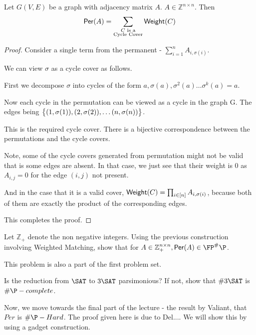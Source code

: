 \begin{lemma}
Let $G(V,E)$ be a graph with adjacency matrix $A$. 
$A \in \mathbb{Z}^{n\times n}$. Then 
\begin{equation}
	{\sf Per}(A) = \sum_{\substack{C \text{ is a} \\ \text{Cycle Cover}}} {\sf Weight}(C)
\end{equation}
\end{lemma}
\begin{proof}
Consider a single term from the permanent - $\sum^n_{i=1}A_{i,\sigma(i)}$.

We can view $\sigma$ as a cycle cover as follows. 

First we decompose $\sigma$ into cycles of the form $a, \sigma(a), \sigma^2(a)\dots \sigma^k(a) = a$. 

Now each cycle in the permutation can be viewed as a cycle in the graph G. The edges being $\big{\{} (1, \sigma(1)),(2, \sigma(2)), \dots (n, \sigma(n)) \big{\}}$.

This is the required cycle cover. There is a bijective correspondence between the permutations and the cycle covers. 

Note, some of the cycle covers generated from permutation might not be valid that is some edges are absent. In that case, we just see that their weight is 0 as $A_{i,j} = 0$ for the edge $(i,j)$ not present. 

And in the case that it is a valid cover, ${\sf Weight}(C) = \prod_{i\in[n]}A_{i,\sigma(i)}$, because both of them are exactly the product of the corresponding edges.

This completes the proof.
\end{proof}


\begin{exercise}
Let $\mathbb{Z}_+$ denote the non negative integers.
Using the previous construction involving Weighted Matching, 
show that for $A\in \mathbb{Z}_{+}^{n\times n}, \per(A)\in \FP^\sP$.

 This problem is also a part of the first problem set.
\end{exercise}


\begin{exercise}
Is the reduction from $\SAT$ to $3\SAT$ parsimonious? If not, show that $\#3\SAT$ is $\sP-complete$. 
\end{exercise}

Now, we move towards the final part of the lecture - the result by Valiant, that $Per$ is $\sP-Hard$. The proof given here is due to Del.... %
We will show this by using a gadget construction.

